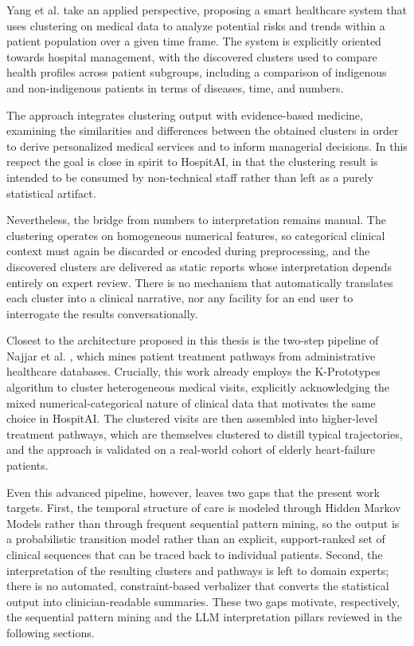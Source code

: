 Yang et al. \cite{yang2024} take an applied perspective, proposing a smart healthcare system that uses clustering on medical data to analyze potential risks and trends within a patient population over a given time frame. The system is explicitly oriented towards hospital management, with the discovered clusters used to compare health profiles across patient subgroups, including a comparison of indigenous and non-indigenous patients in terms of diseases, time, and numbers.

The approach integrates clustering output with evidence-based medicine, examining the similarities and differences between the obtained clusters in order to derive personalized medical services and to inform managerial decisions. In this respect the goal is close in spirit to HospitAI, in that the clustering result is intended to be consumed by non-technical staff rather than left as a purely statistical artifact.

Nevertheless, the bridge from numbers to interpretation remains manual. The clustering operates on homogeneous numerical features, so categorical clinical context must again be discarded or encoded during preprocessing, and the discovered clusters are delivered as static reports whose interpretation depends entirely on expert review. There is no mechanism that automatically translates each cluster into a clinical narrative, nor any facility for an end user to interrogate the results conversationally.

Closest to the architecture proposed in this thesis is the two-step pipeline of Najjar et al. \cite{najjar2018}, which mines patient treatment pathways from administrative healthcare databases. Crucially, this work already employs the K-Prototypes algorithm to cluster heterogeneous medical visits, explicitly acknowledging the mixed numerical-categorical nature of clinical data that motivates the same choice in HospitAI. The clustered visits are then assembled into higher-level treatment pathways, which are themselves clustered to distill typical trajectories, and the approach is validated on a real-world cohort of elderly heart-failure patients.

Even this advanced pipeline, however, leaves two gaps that the present work targets. First, the temporal structure of care is modeled through Hidden Markov Models rather than through frequent sequential pattern mining, so the output is a probabilistic transition model rather than an explicit, support-ranked set of clinical sequences that can be traced back to individual patients. Second, the interpretation of the resulting clusters and pathways is left to domain experts; there is no automated, constraint-based verbalizer that converts the statistical output into clinician-readable summaries. These two gaps motivate, respectively, the sequential pattern mining and the LLM interpretation pillars reviewed in the following sections.
